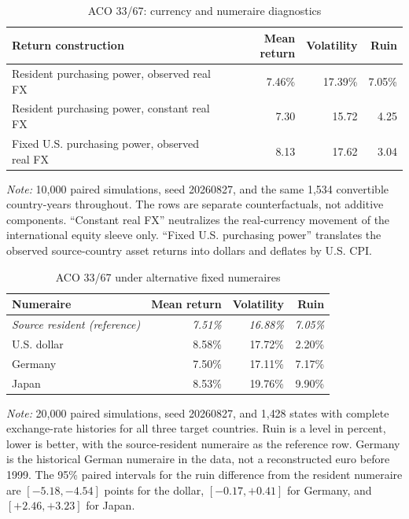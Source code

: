 \documentclass[11pt]{article}
\begin{document}
\begin{table}[H]
\centering
\caption{ACO 33/67: currency and numeraire diagnostics}
\label{tab:currency-numeraire}
\setlength{\tabcolsep}{5pt}
\small
\begin{tabular}{lrrr}
\toprule
Return construction & Mean return & Volatility & Ruin \\
\midrule
Resident purchasing power, observed real FX & 7.46\% & 17.39\% & 7.05\% \\
Resident purchasing power, constant real FX & 7.30 & 15.72 & 4.25 \\
Fixed U.S. purchasing power, observed real FX & 8.13 & 17.62 & 3.04 \\
\bottomrule
\end{tabular}
\begin{minipage}{0.94\textwidth}\footnotesize
\textit{Note:} 10,000 paired simulations, seed 20260827, and the same 1{,}534
convertible country-years throughout. The rows are separate counterfactuals, not
additive components. ``Constant real FX'' neutralizes the real-currency movement
of the international equity sleeve only. ``Fixed U.S. purchasing power''
translates the observed source-country asset returns into dollars and deflates
by U.S. CPI.
\end{minipage}
\end{table}

\begin{table}[H]
\centering
\caption{ACO 33/67 under alternative fixed numeraires}
\label{tab:multiple-numeraires}
\setlength{\tabcolsep}{6pt}
\small
\begin{tabular}{lrrr}
\toprule
Numeraire & Mean return & Volatility & Ruin \\
\midrule
\emph{Source resident (reference)} & \emph{7.51\%} & \emph{16.88\%} & \emph{7.05\%} \\
\addlinespace
U.S. dollar & 8.58\% & 17.72\% & 2.20\% \\
Germany & 7.50\% & 17.11\% & 7.17\% \\
Japan & 8.53\% & 19.76\% & 9.90\% \\
\bottomrule
\end{tabular}
\begin{minipage}{0.94\textwidth}\footnotesize
\textit{Note:} 20,000 paired simulations, seed 20260827, and 1{,}428 states
with complete exchange-rate histories for all three target countries. Ruin is a
level in percent, lower is better, with the source-resident numeraire as the
reference row. Germany is the historical German numeraire in the data, not a
reconstructed euro before 1999. The 95\% paired intervals for the ruin
difference from the resident numeraire are $[-5.18,-4.54]$ points for the
dollar, $[-0.17,+0.41]$ for Germany, and $[+2.46,+3.23]$ for Japan.
\end{minipage}
\end{table}
\end{document}
